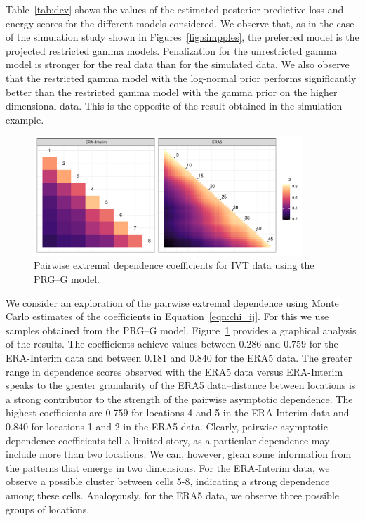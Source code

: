 Table~\ref{tab:dev} shows the values of the estimated posterior predictive loss and energy scores for the different models considered. We observe that, as in the case of the simulation study shown in Figures~\ref{fig:simpples}, the preferred model is the projected restricted 
  gamma models.  Penalization for the unrestricted gamma model is 
  stronger for the real data than for the simulated data. We also observe that
  the restricted gamma model with the log-normal prior performs significantly better 
  than the restricted gamma model with the gamma prior on the higher dimensional data. This is the opposite of the result obtained in the simulation example.

\begin{figure}[htb]
    \centering
    \caption{Pairwise extremal dependence coefficients for IVT data using the PRG--G model.\label{fig:chi_ij}}
    \includegraphics[width=0.9\textwidth]{./images/chi_ij_c}
\end{figure}

We consider an exploration of the pairwise extremal dependence using Monte Carlo estimates of the 
  coefficients in  Equation~\ref{eqn:chi_ij}. For this we use samples obtained from the PRG--G model.
  Figure~\ref{fig:chi_ij} provides a graphical analysis of the results. 
  The coefficients achieve values between $0.286$ and $0.759$ for the ERA-Interim data and 
  between $0.181$ and $0.840$ for the ERA5 data.  The greater range in dependence scores observed 
  with the ERA5 data versus ERA-Interim speaks to the greater granularity of the ERA5 data--distance between locations is a strong contributor to the strength of the 
  pairwise asymptotic dependence. The highest coefficients are $0.759$ for 
  locations 4 and 5 in the ERA-Interim data and
  $0.840$ for locations 1 and 2 in the ERA5 data.  Clearly, pairwise asymptotic
  dependence coefficients tell a limited story, as a particular dependence may include
  more than two locations.   We can, however, glean some information from the patterns that
  emerge in two dimensions.  For the ERA-Interim data, we observe a possible cluster 
  between cells 5-8, indicating a strong dependence among these cells.  Analogously, for
  the ERA5 data, we observe three possible groups of locations.

